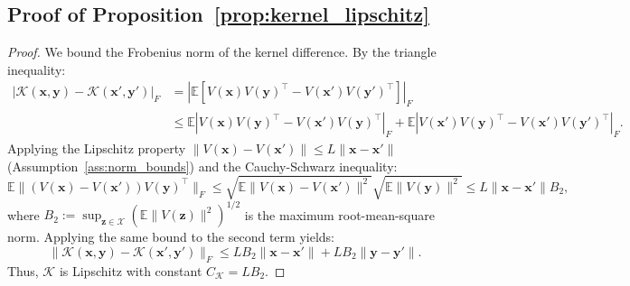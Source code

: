 \documentclass{article}
\theoremstyle{plain}
\theoremstyle{definition}
\theoremstyle{remark}
\begin{document}
\subsection{Proof of Proposition~\ref{prop:kernel_lipschitz}}
\begin{proof}
We bound the Frobenius norm of the kernel difference. 
By the triangle inequality:
\begin{align}|\mathcal{K}(\bm{x}, \bm{y}) - \mathcal{K}(\bm{x}', \bm{y}')|_F&
= |\mathbb{E}[V(\bm{x})V(\bm{y})^\top - V(\bm{x}')V(\bm{y}')^\top]|_F \nonumber \\
&\le \mathbb{E} |V(\bm{x})V(\bm{y})^\top - V(\bm{x}')V(\bm{y})^\top|_F + \mathbb{E} |V(\bm{x}')V(\bm{y})^\top - V(\bm{x}')V(\bm{y}')^\top|_F.
\end{align}
Applying the Lipschitz property $\|V(\bm{x}) - V(\bm{x}')\| \le L\|\bm{x}-\bm{x}'\|$ (Assumption~\ref{ass:norm_bounds}) and the Cauchy-Schwarz inequality:
$$\mathbb{E} \|(V(\bm{x}) - V(\bm{x}'))V(\bm{y})^\top\|_F \le \sqrt{\mathbb{E}\|V(\bm{x})-V(\bm{x}')\|^2} \sqrt{\mathbb{E}\|V(\bm{y})\|^2} \le L \|\bm{x}-\bm{x}'\| B_2,$$
where $B_2 := \sup_{\bm{z}\in\mathcal{X}} (\mathbb{E}\|V(\bm{z})\|^2)^{1/2}$ is the maximum root-mean-square norm.
Applying the same bound to the second term yields:
$$\|\mathcal{K}(\bm{x}, \bm{y}) - \mathcal{K}(\bm{x}', \bm{y}')\|_F \le L B_2 \|\bm{x}-\bm{x}'\| + L B_2 \|\bm{y}-\bm{y}'\|.$$
Thus, $\mathcal{K}$ is Lipschitz with constant $C_{\mathcal{K}} = L B_2$.
\end{proof}
\end{document}
